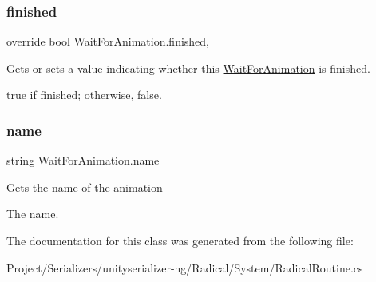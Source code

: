 \subsubsection{\texorpdfstring{finished}{finished}}
{\footnotesize\ttfamily override bool Wait\+For\+Animation.\+finished\hspace{0.3cm}{\ttfamily [get]}, {\ttfamily [set]}}



Gets or sets a value indicating whether this \hyperlink{class_wait_for_animation}{Wait\+For\+Animation} is finished. 

{\ttfamily true} if finished; otherwise, {\ttfamily false}. \mbox{\label{class_wait_for_animation_a2bd9db632988be8570fb739741d80222}} 
\subsubsection{\texorpdfstring{name}{name}}
{\footnotesize\ttfamily string Wait\+For\+Animation.\+name\hspace{0.3cm}{\ttfamily [get]}}



Gets the name of the animation 

The name. 

The documentation for this class was generated from the following file\+:\begin{DoxyCompactItemize}
\item 
Project/\+Serializers/unityserializer-\/ng/\+Radical/\+System/Radical\+Routine.\+cs\end{DoxyCompactItemize}
